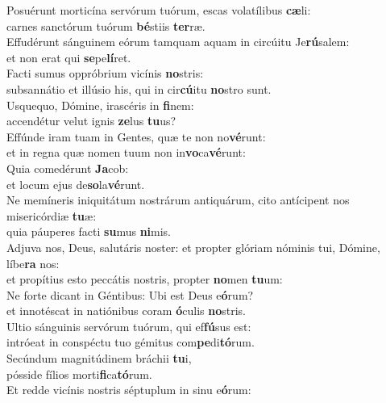 \evenverse Posuérunt morticína servórum tuórum, escas volatílibus \textbf{cæ}li:~\*\\
\evenverse carnes sanctórum tuórum \textbf{bé}stiis \textbf{ter}ræ.\\
\oddverse Effudérunt sánguinem eórum tamquam aquam in circúitu Je\textbf{rú}salem:~\*\\
\oddverse et non erat qui \textbf{se}pe\textbf{lí}ret.\\
\evenverse Facti sumus oppróbrium vicínis \textbf{no}stris:~\*\\
\evenverse subsannátio et illúsio his, qui in cir\textbf{cú}itu \textbf{no}stro sunt.\\
\oddverse Usquequo, Dómine, irascéris in \textbf{fi}nem:~\*\\
\oddverse accendétur velut ignis \textbf{ze}lus \textbf{tu}us?\\
\evenverse Effúnde iram tuam in Gentes, quæ te non no\textbf{vé}runt:~\*\\
\evenverse et in regna quæ nomen tuum non in\textbf{vo}ca\textbf{vé}runt:\\
\oddverse Quia comedérunt \textbf{Ja}cob:~\*\\
\oddverse et locum ejus de\textbf{so}la\textbf{vé}runt.\\
\evenverse Ne memíneris iniquitátum nostrárum antiquárum, cito antícipent nos misericórdiæ \textbf{tu}æ:~\*\\
\evenverse quia páuperes facti \textbf{su}mus \textbf{ni}mis.\\
\oddverse Adjuva nos, Deus, salutáris noster: et propter glóriam nóminis tui, Dómine, líbe\textbf{ra} nos:~\*\\
\oddverse et propítius esto peccátis nostris, propter \textbf{no}men \textbf{tu}um:\\
\evenverse Ne forte dicant in Géntibus: Ubi est Deus e\textbf{ó}rum?~\*\\
\evenverse et innotéscat in natiónibus coram \textbf{ó}culis \textbf{no}stris.\\
\oddverse Ultio sánguinis servórum tuórum, qui ef\textbf{fú}sus est:~\*\\
\oddverse intróeat in conspéctu tuo gémitus com\textbf{pe}di\textbf{tó}rum.\\
\evenverse Secúndum magnitúdinem bráchii \textbf{tu}i,~\*\\
\evenverse pósside fílios morti\textbf{fi}ca\textbf{tó}rum.\\
\oddverse Et redde vicínis nostris séptuplum in sinu e\textbf{ó}rum:~\*\\
